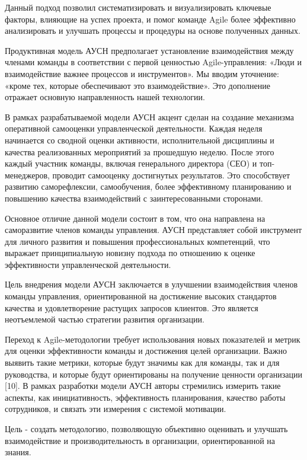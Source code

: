 \begin{multicols}{2}

Данный подход позволил систематизировать и визуализировать ключевые
факторы, влияющие на успех проекта, и помог команде Agile более
эффективно анализировать и улучшать процессы и процедуры на основе
полученных данных.

Продуктивная модель АУСН предполагает установление взаимодействия между
членами команды в соответствии с первой ценностью Agile-управления:
«Люди и взаимодействие важнее процессов и инструментов». Мы вводим
уточнение: «кроме тех, которые обеспечивают это взаимодействие». Это
дополнение отражает основную направленность нашей технологии.

В рамках разрабатываемой модели АУСН акцент сделан на создание механизма
оперативной самооценки управленческой деятельности. Каждая неделя
начинается со сводной оценки активности, исполнительной дисциплины и
качества реализованных мероприятий за прошедшую неделю. После этого
каждый участник команды, включая генерального директора (СЕО) и
топ-менеджеров, проводит самооценку достигнутых результатов. Это
способствует развитию саморефлексии, самообучения, более эффективному
планированию и повышению качества взаимодействий с заинтересованными
сторонами.

Основное отличие данной модели состоит в том, что она направлена на
саморазвитие членов команды управления. АУСН представляет собой
инструмент для личного развития и повышения профессиональных
компетенций, что выражает принципиальную новизну подхода по отношению к
оценке эффективности управленческой деятельности.

Цель внедрения модели АУСН заключается в улучшении взаимодействия членов
команды управления, ориентированной на достижение высоких стандартов
качества и удовлетворение растущих запросов клиентов. Это является
неотъемлемой частью стратегии развития организации.

Переход к Agile-методологии требует использования новых показателей и
метрик для оценки эффективности команды и достижения целей организации.
Важно выявить такие метрики, которые будут значимы как для команды, так
и для руководства, и которые будут ориентированы на получение ценности
организации {[}10{]}. В рамках разработки модели АУСН авторы стремились
измерить такие аспекты, как инициативность, эффективность планирования,
качество работы сотрудников, и связать эти измерения с системой
мотивации.

Цель - создать методологию, позволяющую объективно оценивать и улучшать
взаимодействие и производительность в организации, ориентированной на
знания.


\end{multicols}
